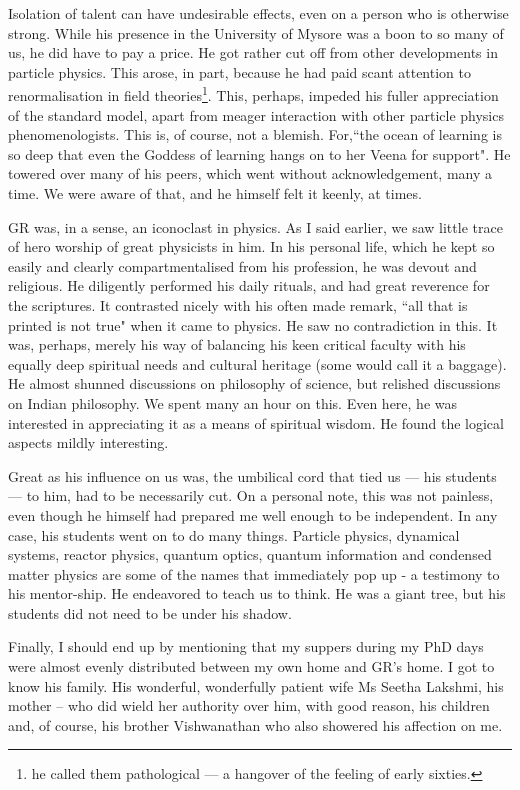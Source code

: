 Isolation of talent can have undesirable effects, even on a person who is otherwise strong. While his presence in the University of Mysore was a boon to so many of us, he did have to pay a price. He got rather cut off from other developments in particle physics. This arose, in part, because he had paid scant attention to renormalisation in field theories\footnote{he called them pathological --- a hangover of the feeling of early sixties.}. This, perhaps, impeded his fuller appreciation of the standard model, apart from meager interaction with other particle physics phenomenologists. This is, of course, not a blemish. For,``the ocean of learning is so deep that even the Goddess of learning hangs on to her Veena for support". He towered over many of his peers, which went without acknowledgement, many a time. We were aware of that, and he himself felt it keenly, at times.

GR was, in a sense, an iconoclast in physics. As I said earlier, we saw little trace of hero worship of great physicists in him. In his personal life, which he kept so easily and clearly compartmentalised from his profession, he was devout and religious. He diligently performed his daily rituals, and had great reverence for the scriptures. It contrasted nicely with his often made remark, ``all that is printed is not true" when it came to physics. He saw no contradiction in this. It was, perhaps, merely his way of balancing his keen critical faculty with his equally deep spiritual needs and cultural heritage (some would call it a baggage).  He almost shunned discussions on philosophy of science, but relished discussions on Indian philosophy. We spent many an hour on this. Even here, he was interested in appreciating it as a means of spiritual wisdom. He found the logical aspects mildly interesting.

Great as his influence on us was, the umbilical cord that tied us --- his students --- to him, had to be necessarily cut. On a personal note, this was not painless, even though he himself had prepared me well enough to be independent. In any case, his students went on to do many things. Particle physics, dynamical systems, reactor physics, quantum optics, quantum information and condensed matter physics are some of the names that immediately pop up - a testimony to his mentor-ship. He endeavored to teach us to think. He was a giant tree, but his students did not need to be under his shadow.

Finally, I should end up by mentioning that my suppers during my PhD days were almost evenly distributed between my own home and GR's home. I got to know his family. His wonderful, wonderfully patient wife Ms Seetha Lakshmi, his mother -- who did wield her authority over him, with good reason, his children and, of course, his brother Vishwanathan who also showered his affection on me.


